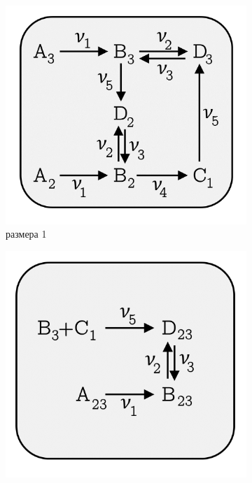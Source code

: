 \documentclass[14pt, a4paper]{extreport}
\begin{document}
\begin{figure}[b]
	\begin{subfigure}{.3\linewidth}
		\includegraphics[width=\linewidth]{EMU_graph_1.png}
		\caption{размера 1}
		\label {emu_graph_1}
	\end{subfigure}
	\begin{subfigure}{.3\linewidth}
		\includegraphics[width=\linewidth]{EMU_graph_2.png}

\end{subfigure}
\end{figure}
\end{document}
